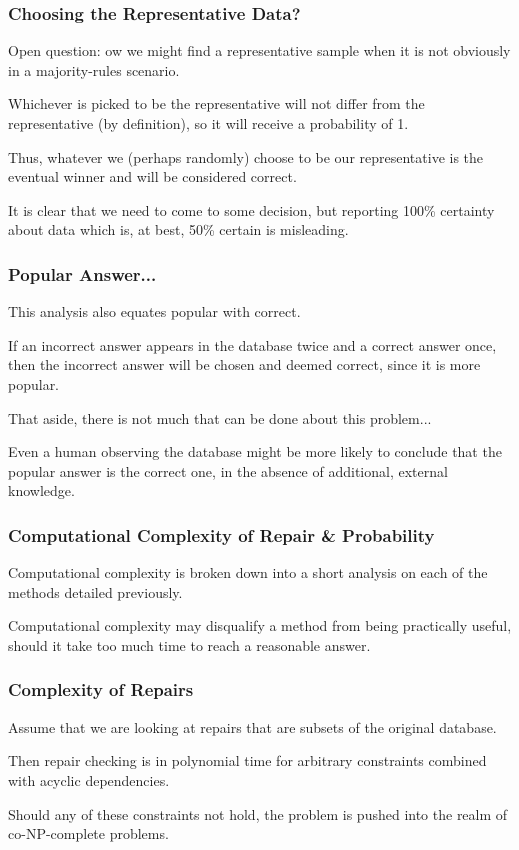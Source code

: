 \begin{frame}
\frametitle{Choosing the Representative Data?}

Open question: ow we might find a representative sample when it is not obviously in a majority-rules scenario.

Whichever is picked to be the representative will not differ from the representative (by definition), so it will receive a probability of 1. 

Thus, whatever we (perhaps randomly) choose to be our representative is the eventual winner and will be considered correct. 

It is clear that we need to come to some decision, but reporting 100\% certainty about data which is, at best, 50\% certain is misleading. 

\end{frame}

\begin{frame}
\frametitle{Popular Answer...}

This analysis also equates popular with correct.

If an incorrect answer appears in the database twice and a correct answer once, then the incorrect answer will be chosen and deemed correct, since it is more popular. 

That aside, there is not much that can be done about this problem... 

Even a human observing the database might be more likely to conclude that the popular answer is the correct one, in the absence of additional, external knowledge.

\end{frame}


\begin{frame}
\frametitle{Computational Complexity of Repair \& Probability}

Computational complexity is broken down into a short analysis on each of the methods detailed previously.

Computational complexity may disqualify a method from being practically useful, should it take too much time to reach a reasonable answer.



\end{frame}


\begin{frame}
\frametitle{Complexity of Repairs}

Assume that we are looking at repairs that are subsets of the original database.

Then repair checking is in polynomial time for arbitrary constraints combined with acyclic dependencies. 

Should any of these constraints not hold, the problem is pushed into the realm of co-NP-complete problems.


\end{frame}

